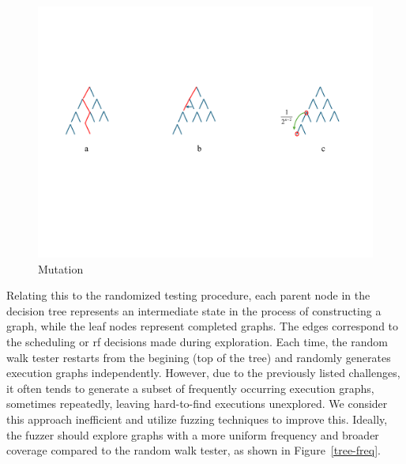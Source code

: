 \begin{figure}[h!tbp]  
    \centering
    \includegraphics[scale=0.5]{figure/tree3.pdf}   
    \caption{Mutation}  
    \label{tree3}  
\end{figure}


Relating this to the randomized testing procedure, each parent node in the decision tree represents an intermediate state in the process of constructing a graph, while the leaf nodes represent completed graphs. The edges correspond to the scheduling or rf decisions made during exploration. Each time, the random walk tester restarts from the begining (top of the tree) and randomly generates execution graphs independently. However, due to the previously listed challenges, it often tends to generate a subset of frequently occurring execution graphs, sometimes repeatedly, leaving hard-to-find executions unexplored. We consider this approach inefficient and utilize fuzzing techniques to improve this. Ideally, the fuzzer should explore graphs with a more uniform frequency and broader coverage compared to  the random walk tester, as shown in Figure~\ref{tree-freq}.

